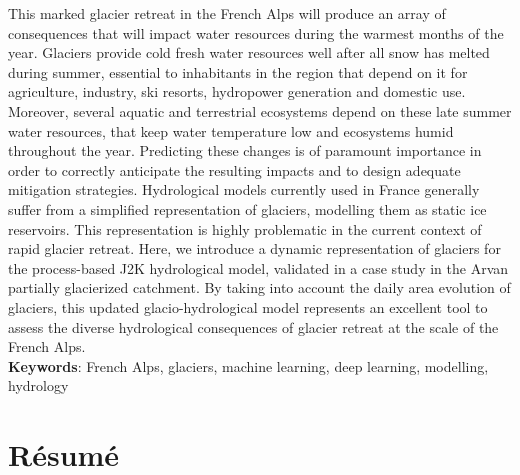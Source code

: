 This marked glacier retreat in the French Alps will produce an array of consequences that will impact water resources during the warmest months of the year. Glaciers provide cold fresh water resources well after all snow has melted during summer, essential to inhabitants in the region that depend on it for agriculture, industry, ski resorts, hydropower generation and domestic use. Moreover, several aquatic and terrestrial ecosystems depend on these late summer water resources, that keep water temperature low and ecosystems humid throughout the year. Predicting these changes is of paramount importance in order to correctly anticipate the resulting impacts and to design adequate mitigation strategies. Hydrological models currently used in France generally suffer from a simplified representation of glaciers, modelling them as static ice reservoirs. This representation is highly problematic in the current context of rapid glacier retreat. Here, we introduce a dynamic representation of glaciers for the process-based J2K hydrological model, validated in a case study in the Arvan partially glacierized catchment. By taking into account the daily area evolution of glaciers, this updated glacio-hydrological model represents an excellent tool to assess the diverse hydrological consequences of glacier retreat at the scale of the French Alps. 
\\

\textbf{Keywords}: French Alps, glaciers, machine learning, deep learning, modelling, hydrology

\newpage

\section*{Résumé}

